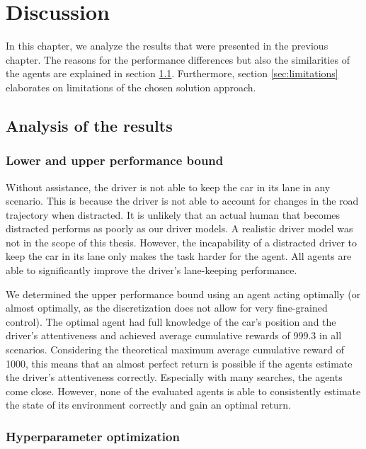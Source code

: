 \chapter{Discussion}
\label{ch:discussion}

In this chapter, we analyze the results that were presented in the previous chapter. The reasons for the performance differences but also the similarities of the agents are explained in section \ref{sec:discussion_analysis}. Furthermore, section \ref{sec:limitations} elaborates on limitations of the chosen solution approach.

\section{Analysis of the results}
\label{sec:discussion_analysis}

\subsection{Lower and upper performance bound}

Without assistance, the driver is not able to keep the car in its lane in any scenario. This is because the driver is not able to account for changes in the road trajectory when distracted. It is unlikely that an actual human that becomes distracted performs as poorly as our driver models. A realistic driver model was not in the scope of this thesis. However, the incapability of a distracted driver to keep the car in its lane only makes the task harder for the agent. All agents are able to significantly improve the driver's lane-keeping performance.

We determined the upper performance bound using an agent acting optimally (or almost optimally, as the discretization does not allow for very fine-grained control). The optimal agent had full knowledge of the car's position and the driver's attentiveness and achieved average cumulative rewards of 999.3 in all scenarios. Considering the theoretical maximum average cumulative reward of 1000, this means that an almost perfect return is possible if the agents estimate the driver's attentiveness correctly. Especially with many searches, the agents come close. However, none of the evaluated agents is able to consistently estimate the state of its environment correctly and gain an optimal return.

\subsection{Hyperparameter optimization}

